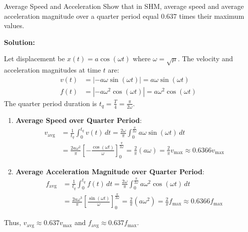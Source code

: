 \begin{examplebox}{Average Speed and Acceleration}
Show that in SHM, average speed and average acceleration magnitude over a quarter period equal $0.637$ times their maximum values.

\tcblower
\textbf{Solution:}

Let displacement be $x(t) = a \cos(\omega t)$ where $\omega = \sqrt{\mu}$.
The velocity and acceleration magnitudes at time $t$ are:
\begin{align*}
    v(t) &= |-a\omega \sin(\omega t)| = a\omega \sin(\omega t) \\
    f(t) &= |-a\omega^2 \cos(\omega t)| = a\omega^2 \cos(\omega t)
\end{align*}
The quarter period duration is $t_q = \frac{T}{4} = \frac{\pi}{2\omega}$.

\begin{enumerate}[leftmargin=1.5em]
    \item \textbf{Average Speed over Quarter Period}:\\
    \begin{align*}
        v_{\text{avg}} &= \frac{1}{t_q} \int_0^{t_q} v(t) \, dt = \frac{2\omega}{\pi} \int_0^{\frac{\pi}{2\omega}} a\omega \sin(\omega t) \, dt \\
        &= \frac{2 a \omega^2}{\pi} \left[ -\frac{\cos(\omega t)}{\omega} \right]_0^{\frac{\pi}{2\omega}} = \frac{2}{\pi} (a\omega) = \frac{2}{\pi} v_{\max} \approx 0.6366 v_{\max}
    \end{align*}
    
    \item \textbf{Average Acceleration Magnitude over Quarter Period}:\\
    \begin{align*}
        f_{\text{avg}} &= \frac{1}{t_q} \int_0^{t_q} f(t) \, dt = \frac{2\omega}{\pi} \int_0^{\frac{\pi}{2\omega}} a\omega^2 \cos(\omega t) \, dt \\
        &= \frac{2 a \omega^3}{\pi} \left[ \frac{\sin(\omega t)}{\omega} \right]_0^{\frac{\pi}{2\omega}} = \frac{2}{\pi} (a\omega^2) = \frac{2}{\pi} f_{\max} \approx 0.6366 f_{\max}
    \end{align*}
\end{enumerate}
Thus, $v_{\text{avg}} \approx 0.637 v_{\max}$ and $f_{\text{avg}} \approx 0.637 f_{\max}$.
\end{examplebox}

